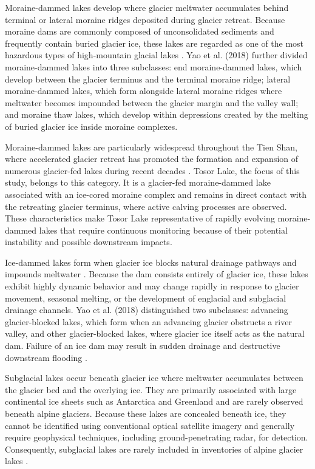 \documentclass[12pt,a4paper]{report}
\begin{document}
Moraine-dammed lakes develop where glacier meltwater accumulates behind terminal or lateral moraine ridges deposited during glacier retreat. Because moraine dams are commonly composed of unconsolidated sediments and frequently contain buried glacier ice, these lakes are regarded as one of the most hazardous types of high-mountain glacial lakes \cite{Richardson2000}. Yao et al. (2018) further divided moraine-dammed lakes into three subclasses: end moraine-dammed lakes, which develop between the glacier terminus and the terminal moraine ridge; lateral moraine-dammed lakes, which form alongside lateral moraine ridges where meltwater becomes impounded between the glacier margin and the valley wall; and moraine thaw lakes, which develop within depressions created by the melting of buried glacier ice inside moraine complexes.

Moraine-dammed lakes are particularly widespread throughout the Tien Shan, where accelerated glacier retreat has promoted the formation and expansion of numerous glacier-fed lakes during recent decades \cite{Zaginaev2016}. Tosor Lake, the focus of this study, belongs to this category. It is a glacier-fed moraine-dammed lake associated with an ice-cored moraine complex and remains in direct contact with the retreating glacier terminus, where active calving processes are observed. These characteristics make Tosor Lake representative of rapidly evolving moraine-dammed lakes that require continuous monitoring because of their potential instability and possible downstream impacts.

Ice-dammed lakes form when glacier ice blocks natural drainage pathways and impounds meltwater \cite{Yao2018}. Because the dam consists entirely of glacier ice, these lakes exhibit highly dynamic behavior and may change rapidly in response to glacier movement, seasonal melting, or the development of englacial and subglacial drainage channels. Yao et al. (2018) distinguished two subclasses: advancing glacier-blocked lakes, which form when an advancing glacier obstructs a river valley, and other glacier-blocked lakes, where glacier ice itself acts as the natural dam. Failure of an ice dam may result in sudden drainage and destructive downstream flooding \cite{Richardson2000}.

Subglacial lakes occur beneath glacier ice where meltwater accumulates between the glacier bed and the overlying ice. They are primarily associated with large continental ice sheets such as Antarctica and Greenland and are rarely observed beneath alpine glaciers. Because these lakes are concealed beneath ice, they cannot be identified using conventional optical satellite imagery and generally require geophysical techniques, including ground-penetrating radar, for detection. Consequently, subglacial lakes are rarely included in inventories of alpine glacier lakes \cite{livingstone2022}.
\end{document}
